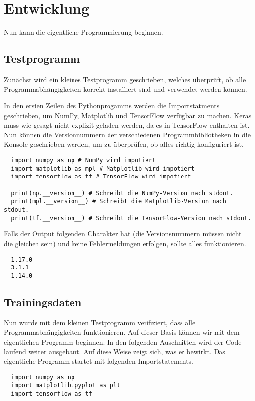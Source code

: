 \section{Entwicklung}
Nun kann die eigentliche Programmierung beginnen.

\subsection{Testprogramm}
Zunächst wird ein kleines Testprogramm geschrieben, welches überprüft, ob
alle Programmabhängigkeiten korrekt installiert sind und verwendet werden können.

In den ersten Zeilen des Pythonprogamms werden die Importstatments
geschrieben, um NumPy, Matplotlib und TensorFlow verfügbar zu machen.
Keras muss wie gesagt nicht explizit geladen werden, da es in TensorFlow
enthalten ist.
Nun können die Versionnummern der verschiedenen Programmbibliotheken
in die Konsole geschrieben werden, um zu überprüfen, ob alles richtig konfiguriert ist.
\begin{verbatim}
  import numpy as np # NumPy wird impotiert
  import matplotlib as mpl # Matplotlib wird impotiert
  import tensorflow as tf # TensorFlow wird impotiert

  print(np.__version__) # Schreibt die NumPy-Version nach stdout.
  print(mpl.__version__) # Schreibt die Matplotlib-Version nach stdout.
  print(tf.__version__) # Schreibt die TensorFlow-Version nach stdout.
\end{verbatim}
Falls der Output folgenden Charakter hat (die Versionsnummern müssen nicht
die gleichen sein) und keine Fehlermeldungen erfolgen, sollte alles funktionieren.
\begin{verbatim}
  1.17.0
  3.1.1
  1.14.0
\end{verbatim}
\para{}

\subsection{Trainingsdaten}
Nun wurde mit dem kleinen Testprogramm verifiziert, dass alle
Programmabhängigkeiten funktionieren. Auf dieser Basis können wir mit dem
eigentlichen Programm beginnen.
\para{}
In den folgenden Auschnitten wird der Code laufend weiter ausgebaut.
Auf diese Weise zeigt sich, was er bewirkt.
Das eigentliche Programm startet mit folgenden Importstatements.
\begin{verbatim}
  import numpy as np
  import matplotlib.pyplot as plt
  import tensorflow as tf
\end{verbatim}

